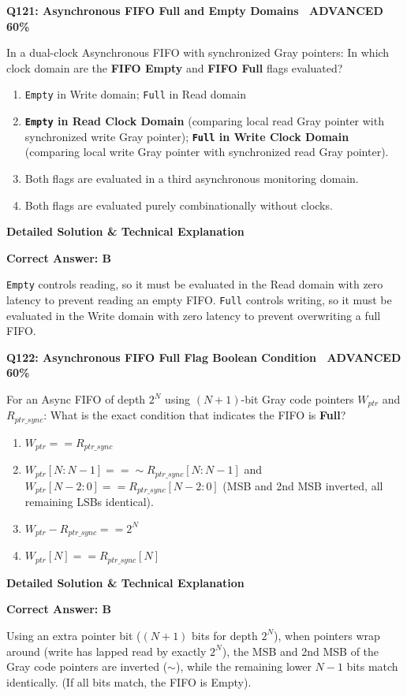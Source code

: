 \documentclass[11pt,a4paper]{article}
\newcommand{\badgeadv}{{\color{white}\colorbox{advred}{\bfseries\sffamily\tiny\ ADVANCED 60\%\ }}}
\newenvironment{qbox}[2]{%
  \begin{mdframed}[style=qstyle]%
  {\bfseries\sffamily\color{primaryblue}#1 \hfill #2}\par\vspace{2pt}%
}{%
  \end{mdframed}%
}
\newenvironment{ansbox}{%
  \begin{mdframed}[style=ansstyle]%
  {\bfseries\sffamily\color{ansgreen}\small Detailed Solution \& Technical Explanation}\par\vspace{2pt}\small%
}{%
  \end{mdframed}%
}
\begin{document}
\begin{qbox}{Q121: Asynchronous FIFO Full and Empty Domains}{\badgeadv}
In a dual-clock Asynchronous FIFO with synchronized Gray pointers:
In which clock domain are the \textbf{FIFO Empty} and \textbf{FIFO Full} flags evaluated?
\begin{enumerate}[label=\textbf{\Alph*.}]
  \item \texttt{Empty} in Write domain; \texttt{Full} in Read domain
  \item \textbf{\texttt{Empty} in Read Clock Domain} (comparing local read Gray pointer with synchronized write Gray pointer); \textbf{\texttt{Full} in Write Clock Domain} (comparing local write Gray pointer with synchronized read Gray pointer).
  \item Both flags are evaluated in a third asynchronous monitoring domain.
  \item Both flags are evaluated purely combinationally without clocks.
\end{enumerate}
\end{qbox}
\begin{ansbox}
\textbf{Correct Answer: B}

\texttt{Empty} controls reading, so it must be evaluated in the Read domain with zero latency to prevent reading an empty FIFO. \texttt{Full} controls writing, so it must be evaluated in the Write domain with zero latency to prevent overwriting a full FIFO.
\end{ansbox}

\begin{qbox}{Q122: Asynchronous FIFO Full Flag Boolean Condition}{\badgeadv}
For an Async FIFO of depth $2^N$ using $(N+1)$-bit Gray code pointers $W_{ptr}$ and $R_{ptr\_sync}$:  
What is the exact condition that indicates the FIFO is \textbf{Full}?
\begin{enumerate}[label=\textbf{\Alph*.}]
  \item $W_{ptr} == R_{ptr\_sync}$
  \item $W_{ptr}[N:N-1] == \sim R_{ptr\_sync}[N:N-1]$ and $W_{ptr}[N-2:0] == R_{ptr\_sync}[N-2:0]$ (MSB and 2nd MSB inverted, all remaining LSBs identical).
  \item $W_{ptr} - R_{ptr\_sync} == 2^N$
  \item $W_{ptr}[N] == R_{ptr\_sync}[N]$
\end{enumerate}
\end{qbox}
\begin{ansbox}
\textbf{Correct Answer: B}

Using an extra pointer bit ($(N+1)$ bits for depth $2^N$), when pointers wrap around (write has lapped read by exactly $2^N$), the MSB and 2nd MSB of the Gray code pointers are inverted ($\sim$), while the remaining lower $N-1$ bits match identically. (If all bits match, the FIFO is Empty).
\end{ansbox}
\end{document}
